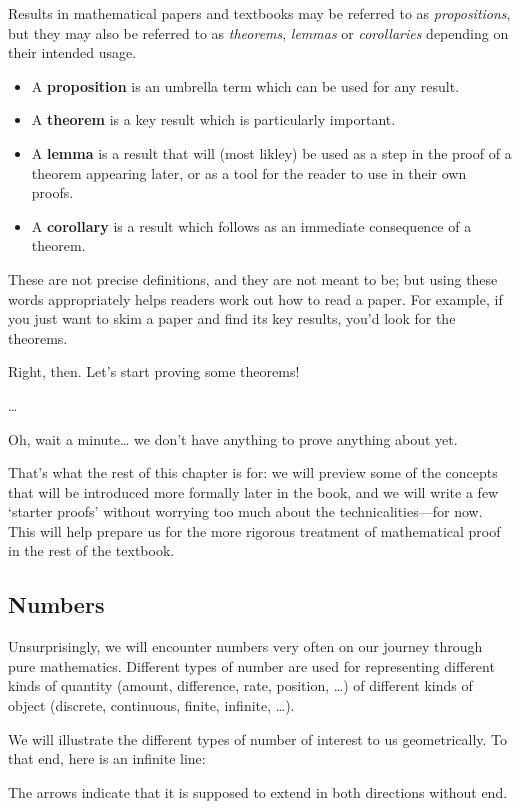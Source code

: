 Results in mathematical papers and textbooks may be referred to as \textit{propositions}, but they may also be referred to as \textit{theorems}, \textit{lemmas} or \textit{corollaries} depending on their intended usage.
\begin{itemize} 
\item A \textbf{proposition} is an umbrella term which can be used for any result.
\item A \textbf{theorem} is a key result which is particularly important.
\item A \textbf{lemma} is a result that will (most likley) be used as a step in the proof of a theorem appearing later, or as a tool for the reader to use in their own proofs.
\item A \textbf{corollary} is a result which follows as an immediate consequence of a theorem.
\end{itemize}

These are not precise definitions, and they are not meant to be; but using these words appropriately helps readers work out how to read a paper. For example, if you just want to skim a paper and find its key results, you'd look for the theorems.

Right, then. Let's start proving some theorems!

\dots{}

Oh, wait a minute\dots{} we don't have anything to prove anything about yet.

That's what the rest of this chapter is for: we will preview some of the concepts that will be introduced more formally later in the book, and we will write a few `starter proofs' without worrying too much about the technicalities---for now. This will help prepare us for the more rigorous treatment of mathematical proof in the rest of the textbook.

\subsection*{Numbers}

Unsurprisingly, we will encounter numbers very often on our journey through pure mathematics. Different types of number are used for representing different kinds of quantity (amount, difference, rate, position, \dots{}) of different kinds of object (discrete, continuous, finite, infinite, \dots{}).

We will illustrate the different types of number of interest to us geometrically. To that end, here is an infinite line:
\begin{center}
\end{center}
The arrows indicate that it is supposed to extend in both directions without end.

